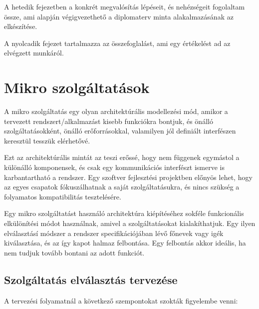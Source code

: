 \documentclass[11pt,magyar,a4paper,oneside,]{report}
\begin{document}
A hetedik fejezetben a konkrét megvalósítás lépéseit, és nehézségeit
fogolaltam össze, ami alapján végigvezethető a diplomaterv minta
alakalmazásának az elkészítése.

A nyolcadik fejezet tartalmazza az összefoglalást, ami egy értékelést ad
az elvégzett munkáról.

\chapter{\texorpdfstring{Mikro szolgáltatások\citep{microservices}
\citep{micro-arch}
\citep{microservices-light}}{Mikro szolgáltatások{[}@microservices{]} {[}@micro-arch{]} {[}@microservices-light{]}}}\label{mikro-szolguxe1ltatuxe1sokmicroservices-micro-arch-microservices-light}

A mikro szolgáltatás egy olyan architektúrális modellezési mód, amikor a
tervezett rendszert/alkalmazást kisebb funkciókra bontjuk, és önálló
szolgáltatásokként, önálló erőforrásokkal, valamilyen jól definiált
interfészen keresztül tesszük elérhetővé.

Ezt az architektúrális mintát az teszi erőssé, hogy nem függenek
egymástol a különálló komponensek, és csak egy kommunikációs interfészt
ismerve is karbantartható a rendszer. Egy szoftver fejlesztési
projektben előnyös lehet, hogy az egyes csapatok fókuszálhatnak a saját
szolgáltatásukra, és nincs szükség a folyamatos kompatibilitás
tesztelésére.

Egy mikro szolgáltatást használó architektúra kiépítéséhez sokféle
funkcionális elkülönítési módot használnak, amivel a szolgáltatásokat
kialakíthatjuk. Egy ilyen elválasztásí módszer a rendszer
specifikációjában lévő főnevek vagy igék kiválasztása, és az így kapot
halmaz felbontása. Egy felbontás akkor ideális, ha nem tudjuk tovább
bontani az adott funkciót.

\section{Szolgáltatás elválasztás
tervezése}\label{szolguxe1ltatuxe1s-elvuxe1lasztuxe1s-tervezuxe9se}

A tervezési folyamatnál a következő szempontokat szokták figyelembe
venni:
\end{document}
